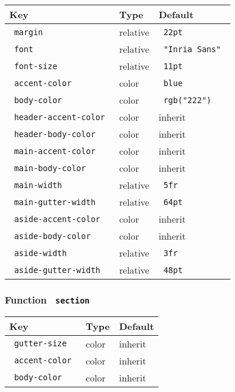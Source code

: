 \begin{longtable}[]{@{}lll@{}}
\toprule\noalign{}
Key & Type & Default \\
\midrule\noalign{}
\endhead
\bottomrule\noalign{}
\endlastfoot
\texttt{\ margin\ } & relative & \texttt{\ 22pt\ } \\
\texttt{\ font\ } & relative & \texttt{\ "Inria\ Sans"\ } \\
\texttt{\ font-size\ } & relative & \texttt{\ 11pt\ } \\
\texttt{\ accent-color\ } & color & \texttt{\ blue\ } \\
\texttt{\ body-color\ } & color & \texttt{\ rgb("222")\ } \\
\texttt{\ header-accent-color\ } & color & inherit \\
\texttt{\ header-body-color\ } & color & inherit \\
\texttt{\ main-accent-color\ } & color & inherit \\
\texttt{\ main-body-color\ } & color & inherit \\
\texttt{\ main-width\ } & relative & \texttt{\ 5fr\ } \\
\texttt{\ main-gutter-width\ } & relative & \texttt{\ 64pt\ } \\
\texttt{\ aside-accent-color\ } & color & inherit \\
\texttt{\ aside-body-color\ } & color & inherit \\
\texttt{\ aside-width\ } & relative & \texttt{\ 3fr\ } \\
\texttt{\ aside-gutter-width\ } & relative & \texttt{\ 48pt\ } \\
\end{longtable}

\subsubsection{\texorpdfstring{Function
\texttt{\ section\ }}{Function  section }}\label{function-section}

\begin{longtable}[]{@{}lll@{}}
\toprule\noalign{}
Key & Type & Default \\
\midrule\noalign{}
\endhead
\bottomrule\noalign{}
\endlastfoot
\texttt{\ gutter-size\ } & color & inherit \\
\texttt{\ accent-color\ } & color & inherit \\
\texttt{\ body-color\ } & color & inherit \\
\end{longtable}

